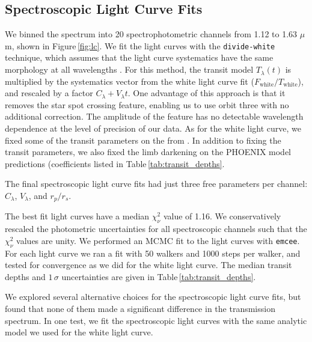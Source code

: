 \documentclass[twocolumn, trackchanges]{aastex61}
\begin{document}
\subsection{Spectroscopic Light Curve Fits}
We binned the spectrum into 20 spectrophotometric channels from 1.12 to 1.63 $\mu$m, shown in Figure\,\ref{fig:lc}. We fit the light curves with the \texttt{divide-white} technique, which assumes that the light curve systematics have the same morphology at all wavelengths \citep{stevenson14c, kreidberg14a}. For this method, the transit model $T_\lambda(t)$ is multiplied by the systematics vector from the white light curve fit ($F_\mathrm{white}/T_\mathrm{white}$), and rescaled by a factor $C_\lambda + V_\lambda t$.  One advantage of this approach is that it removes the star spot crossing feature, enabling us to use orbit three with no additional correction. The amplitude of the feature has no detectable wavelength dependence at the level of precision of our data.  As for the white light curve, we fixed some of the transit parameters on the  from \cite{dai17}.  In addition to fixing the transit parameters, we also fixed the limb darkening on the PHOENIX model predictions (coefficients listed in Table\,\ref{tab:transit_depths}. 

The final spectroscopic light curve fits had just three free parameters per channel: $C_\lambda$, $V_\lambda$, and $r_p/r_s$.  

The best fit light curves have a median $\chi^2_\nu$ value of 1.16.  We conservatively rescaled the photometric uncertainties for all spectroscopic channels such that the $\chi^2_\nu$ values are unity. We performed an MCMC fit to the light curves with \texttt{emcee}.  For each light curve we ran a fit with 50 walkers and 1000 steps per walker, and tested for convergence as we did for the white light curve. The median transit depths and $1\,\sigma$ uncertainties are given in Table\,\ref{tab:transit_depths}. 

We explored several alternative choices for the spectroscopic light curve fits, but found that none of them made a significant difference in the transmission spectrum. In one test, we fit the spectroscopic light curves with the same analytic model we used for the white light curve. 
\end{document}
